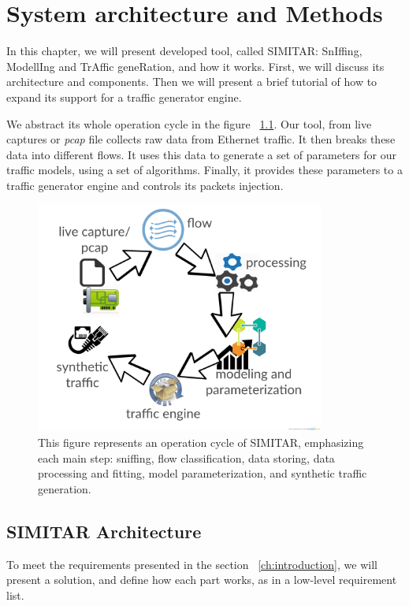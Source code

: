 \chapter{System architecture and Methods}\label{ch:architecture}

In this chapter, we will present developed tool, called SIMITAR: SnIffing, ModellIng and TrAffic geneRation, and how it works. First, we will discuss its architecture and components. Then we will present a brief tutorial of how to expand its support for a traffic generator engine. 

We abstract its whole operation cycle in the figure ~\ref{fig:cycle-of-operation}. Our tool, from live captures or \textit{pcap} file collects raw data from Ethernet traffic. It then breaks these data into different flows. It uses this data to generate a set of parameters for our traffic models, using a set of algorithms. Finally, it provides these parameters to a traffic generator engine and controls its packets injection.

\begin{figure}[ht!]
        \centering
        \includegraphics[height=3.0in]{figures/ch3/digram-project-cycle}
        \caption{This figure represents an operation cycle of SIMITAR, emphasizing each main step: sniffing, flow classification, data storing, data processing and fitting, model parameterization,  and synthetic traffic generation.}
    \label{fig:cycle-of-operation}
\end{figure}


\section{SIMITAR Architecture}

To meet the requirements presented in the section ~\ref{ch:introduction}, we will present a solution, and define how each part works, as in a low-level requirement list\cite{sommerville}.  


